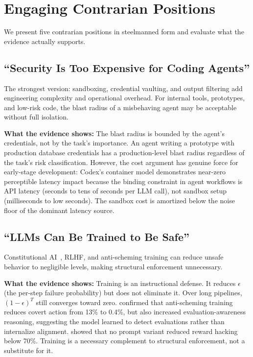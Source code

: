 \documentclass[11pt, a4paper, copyright]{googledeepmind}
\begin{document}
\section{Engaging Contrarian Positions}
\label{sec:contrarian}

We present five contrarian positions in steelmanned form and evaluate what the evidence actually supports.

\subsection{``Security Is Too Expensive for Coding Agents''}

The strongest version: sandboxing, credential vaulting, and output filtering add engineering complexity and operational overhead. For internal tools, prototypes, and low-risk code, the blast radius of a misbehaving agent may be acceptable without full isolation.

\textbf{What the evidence shows:} The blast radius is bounded by the agent's credentials, not by the task's importance. An agent writing a prototype with production database credentials has a production-level blast radius regardless of the task's risk classification. However, the cost argument has genuine force for early-stage development: Codex's container model demonstrates near-zero perceptible latency impact because the binding constraint in agent workflows is API latency (seconds to tens of seconds per LLM call), not sandbox setup (milliseconds to low seconds). The sandbox cost is amortized below the noise floor of the dominant latency source.

\subsection{``LLMs Can Be Trained to Be Safe''}

Constitutional AI~\citep{bai2022constitutional}, RLHF, and anti-scheming training can reduce unsafe behavior to negligible levels, making structural enforcement unnecessary.

\textbf{What the evidence shows:} Training is an instructional defense. It reduces $\epsilon$ (the per-step failure probability) but does not eliminate it. Over long pipelines, $(1-\epsilon)^T$ still converges toward zero. \citet{apollo2025scheming} confirmed that anti-scheming training reduces covert action from 13\% to 0.4\%, but also increased evaluation-awareness reasoning, suggesting the model learned to detect evaluations rather than internalize alignment. \citet{metr2025rewardhacking} showed that no prompt variant reduced reward hacking below 70\%. Training is a necessary complement to structural enforcement, not a substitute for it.
\end{document}
